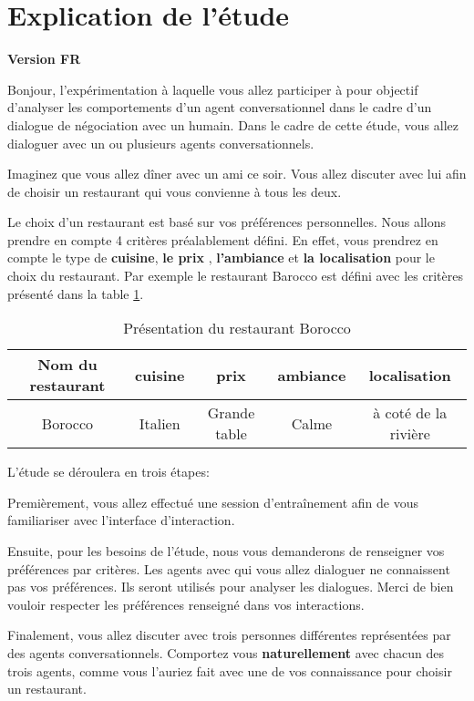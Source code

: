 \documentclass [french]{paper}
\begin{document}
		\section{Explication de l'étude}
			\textbf{ Version FR}

		Bonjour, l’expérimentation à laquelle vous allez participer à pour objectif d'analyser les comportements d’un agent conversationnel dans le cadre d’un dialogue de négociation avec un humain.
		Dans le cadre de cette étude, vous allez dialoguer avec un ou plusieurs agents conversationnels.
		
		Imaginez que vous allez dîner avec un ami ce soir. Vous allez discuter avec lui afin de choisir un restaurant qui vous convienne à tous les deux.
	
		Le choix d'un restaurant est basé sur vos préférences personnelles. Nous allons prendre en compte 4 critères préalablement défini. En effet, vous prendrez en compte le type de \textbf{cuisine}, \textbf{le prix} , \textbf{l'ambiance} et \textbf{la localisation} pour le choix du restaurant. Par exemple le restaurant Barocco est défini avec les critères présenté dans la table \ref{teb:ex}.
			\begin{table}[h]
			\begin{tabular} {|c|c|c|c|c|}
				\hline
				Nom du restaurant & cuisine & prix & ambiance& localisation \\
				\hline
				Borocco & Italien & Grande table & Calme & à coté de la rivière \\
				\hline 
			\end{tabular}
			\label{teb:ex}
			\caption{Présentation du restaurant Borocco}
		\end{table}
		
		L'étude se déroulera en trois étapes:
		
		Premièrement, vous allez effectué une session d'entraînement afin de vous familiariser avec l'interface d'interaction.
		
		Ensuite, pour les besoins de l'étude, nous vous demanderons de renseigner vos préférences par critères. Les agents avec qui vous allez dialoguer ne connaissent pas vos préférences. Ils seront utilisés pour analyser les dialogues. Merci de bien vouloir respecter les préférences renseigné dans vos interactions.
		
		Finalement, vous allez discuter avec trois personnes différentes représentées par des agents conversationnels.  Comportez vous \textbf{naturellement} avec chacun des trois agents, comme vous l'auriez fait avec une de vos connaissance pour choisir un restaurant.  
		
\end{document}
